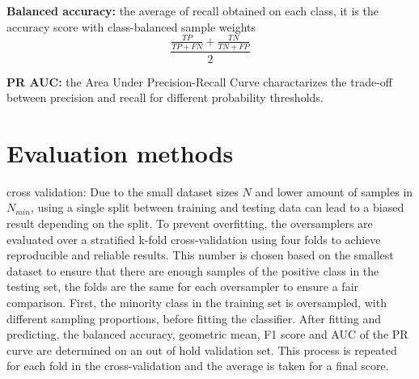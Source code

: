\textbf{Balanced accuracy:} the average of recall obtained on each class, it is the accuracy score with class-balanced sample weights
\begin{equation}
    \frac{\frac{TP}{TP + FN} + \frac{TN}{TN + FP}}{2}
\end{equation}

\textbf{PR AUC:} the Area Under Precision-Recall Curve charactarizes the trade-off between precision and recall for different probability thresholds.

\section{Evaluation methods}
cross validation: Due to the small dataset sizes $N$ and lower amount of samples in $N_{min}$, using a single split between training and testing data can lead to a biased result depending on the split. To prevent overfitting, the oversamplers are evaluated over a stratified k-fold cross-validation using four folds to achieve reproducible and reliable results. This number is chosen based on the smallest dataset to ensure that there are enough samples of the positive class in the testing set, the folds are the same for each oversampler to ensure a fair comparison. First, the minority class in the training set is oversampled, with different sampling proportions, before fitting the classifier. After fitting and predicting, the balanced accuracy, geometric mean, F1 score and AUC of the PR curve are determined on an out of hold validation set. This process is repeated for each fold in the cross-validation and the average is taken for a final score. 